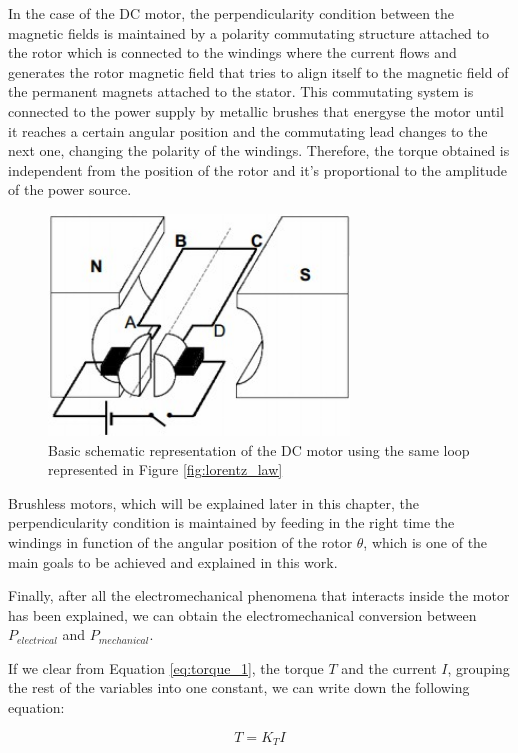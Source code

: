 In the case of the \acf{DC} motor, the perpendicularity condition between the magnetic fields is maintained by a polarity commutating structure attached to the rotor which is connected to the windings where the current flows and generates the rotor magnetic field that tries to align itself to the magnetic field of the permanent magnets attached to the stator. This commutating system is connected to the power supply by metallic brushes that energyse the motor until it reaches a certain angular position and the commutating lead changes to the next one, changing the polarity of the windings. Therefore, the torque obtained is independent from the position of the rotor and it’s proportional to the amplitude of the power source.

\begin{figure}[htbp]
\centering
\includegraphics[width=8cm]{Images/dc_motor.png} 
\caption[DC Motor Scheme]{Basic schematic representation of the \ac{DC} motor using the same loop represented in Figure \ref{fig:lorentz_law}}
\label{fig:dc_motor}
\end{figure}

Brushless motors, which will be explained later in this chapter, the perpendicularity condition is maintained by feeding in the right time the windings in function of the angular position of the rotor $\theta$, which is one of the main goals to be achieved and explained in this work.

Finally, after all the electromechanical phenomena that interacts inside the motor has been explained, we can obtain the electromechanical conversion between $P_{electrical}$ and $P_{mechanical}$.

If we clear from Equation \ref{eq:torque_1}, the torque $T$ and the current $I$, grouping the rest of the variables into one constant, we can write down the following equation:

\begin{equation}
	\label{eq:kt}
	T = K_{T} I
\end{equation}


